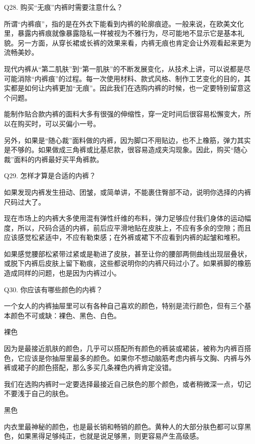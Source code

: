 \documentclass[12pt,UTF8]{ctexbook}
\begin{document}
Q28. 购买“无痕”内裤时需要注意什么？


所谓“内裤痕”，指的是在外衣下能看到内裤的轮廓痕迹。一般来说，在欧美文化里，暴露内裤痕就像暴露隐私一样被视为不雅行为，尽可能地不显示它是基本礼貌。另一方面，从穿长裙或长裤的效果来看，内裤无痕也肯定会让外观看起来更为流畅美妙。

现代内裤从“第二肌肤”到“第一肌肤”的不断发展变化，从技术上讲，可以说都是尽可能消除“内裤痕”的过程。每一次使用材料、款式风格、制作工艺变化的目的，其实都是如何让内裤更加“无痕”。因此我们在选购内裤的时候，也一定要特别留意这个问题。

能制作贴合款内裤的面料大多有很强的伸缩性，穿一定时间后很容易松懈变大，所以在购买时，可以买偏小一号。

另外，如果是“随心裁”面料做的内裤，因为脚口不用贴边，也不上橡筋，弹力其实是不够的。如果做成三角裤或比基尼款，很容易造成夹沟现象。因此，购买“随心裁”面料的内裤最好买平角裤款。





Q29. 怎样才算是合适的内裤？


如果发现内裤发生扭动、团皱，或简单讲，不能裹住臀部不动，说明你选择的内裤尺码过大了。

现在市场上的内裤大多使用混有弹性纤维的布料，弹力足够应付我们身体的运动幅度，所以，尺码合适的内裤，前后应平滑地贴在皮肤上，不应有多余的空隙；而且应该感觉松紧适中，不应有勒束感；在外裤或裙下不应看到内裤的起皱和堆积。

如果感觉腰部松紧带过紧或是勒进了皮肤，甚至让你的腰部两侧曲线出现层叠状，或脱下内裤后皮肤上留下勒痕，这些都说明你的内裤尺码过小了。如果裤脚的橡筋造成同样的问题，也是因为内裤过小。





Q30. 你应该有哪些颜色的内裤？


一个女人的内裤抽屉里可以有各种自己喜欢的颜色，特别是流行颜色，但有三个基本颜色不可或缺：裸色、黑色、白色。

裸色

因为是最接近肌肤的颜色，几乎可以搭配所有颜色的裤装或裙装，被称为内裤百搭色，它应该是你抽屉里最多的颜色。如果你不想动脑筋考虑内裤与文胸、内裤与外裤或裙子的颜色搭配，那么多买几条裸色内裤肯定没错。

我们在选购内裤时一定要选择最接近自己肤色的那个颜色，或者稍微深一点，切记不要浅于自己的肤色。

黑色

内衣里最神秘的颜色，也是最长销和畅销的颜色。黄种人的大部分肤色都可以穿黑色，如果黑得足够纯正，也就是说足够黑，则更容易产生高级感。
\end{document}
